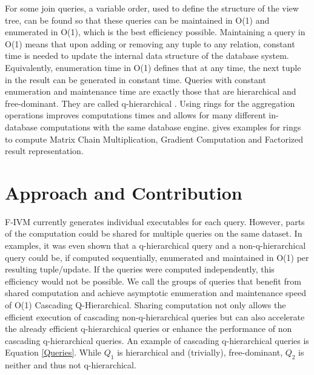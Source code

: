 \documentclass[abstracton,12pt]{scrreprt}
\begin{document}
 For some join queries, a variable order, used to define the structure of the view tree, can be found so that these queries can be maintained in O(1) and enumerated in O(1), which is the best efficiency possible. Maintaining a query in O(1) means that upon adding or removing any tuple to any relation, constant time is needed to update the internal data structure of the database system. Equivalently, enumeration time in O(1)  defines that at any time, the next tuple in the result can be generated in constant time. Queries with constant enumeration and maintenance time are exactly those that are hierarchical and free-dominant. They are called q-hierarchical \autocite{CQAP}.  Using rings for the aggregation operations improves computations times and allows for many different in-database computations with the same database engine. \autocite{FIVM} gives examples for rings to compute Matrix Chain Multiplication, Gradient Computation and Factorized result representation.
\autocite{FIVM}

\chapter{Approach and Contribution}
F-IVM currently generates individual executables for each query. However, parts of the computation could be shared for multiple queries on the same dataset. In examples, it was even shown that a q-hierarchical query and a non-q-hierarchical query could be, if computed sequentially, enumerated and maintained in O(1) per resulting tuple/update. If the queries were computed independently, this efficiency would not be possible. We call the groups of queries that benefit from shared computation and achieve asymptotic enumeration and maintenance speed of O(1) Cascading Q-Hierarchical. Sharing computation not only allows the efficient execution of cascading non-q-hierarchical queries but can also accelerate the already efficient q-hierarchical queries or enhance the performance of non cascading q-hierarchical queries.  An example of cascading q-hierarchical queries is Equation \ref{Queries}. While $Q_1$ is hierarchical and (trivially), free-dominant, $Q_2$ is neither and thus not q-hierarchical.
\end{document}
